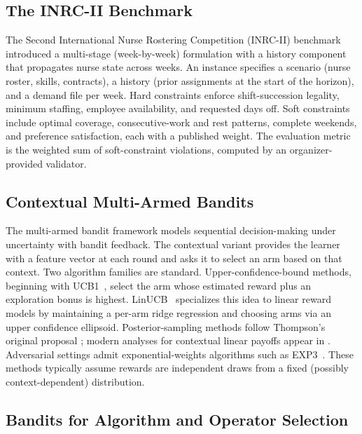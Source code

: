 \documentclass{article}
\begin{document}
\subsection{The INRC-II Benchmark}

The Second International Nurse Rostering Competition (INRC-II)
benchmark~\citep{ceschia2019inrc2} introduced a multi-stage (week-by-week)
formulation with a history component that propagates nurse state across
weeks. An instance specifies a scenario (nurse roster, skills, contracts),
a history (prior assignments at the start of the horizon), and a demand
file per week. Hard constraints enforce shift-succession legality, minimum
staffing, employee availability, and requested days off. Soft constraints
include optimal coverage, consecutive-work and rest patterns, complete
weekends, and preference satisfaction, each with a published weight. The
evaluation metric is the weighted sum of soft-constraint violations,
computed by an organizer-provided validator.

\subsection{Contextual Multi-Armed Bandits}

The multi-armed bandit framework models sequential decision-making under
uncertainty with bandit feedback. The contextual variant
\citep{lattimore2020bandit} provides the learner with a feature vector at
each round and asks it to select an arm based on that context. Two
algorithm families are standard. Upper-confidence-bound methods, beginning
with UCB1~\citep{auer2002finitetime}, select the arm whose estimated reward
plus an exploration bonus is highest. LinUCB~\citep{li2010contextual,chu2011contextual}
specializes this idea to linear reward models by maintaining a per-arm
ridge regression and choosing arms via an upper confidence ellipsoid.
Posterior-sampling methods follow Thompson's original proposal
\citep{thompson1933likelihood}; modern analyses for contextual linear
payoffs appear in \citet{agrawal2013thompson}. Adversarial settings admit
exponential-weights algorithms such as EXP3~\citep{auer2002nonstochastic}.
These methods typically assume rewards are independent draws from a fixed
(possibly context-dependent) distribution.

\subsection{Bandits for Algorithm and Operator Selection}
\end{document}
